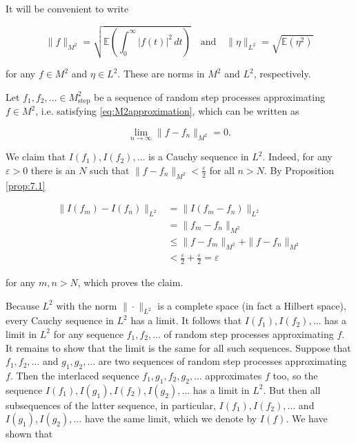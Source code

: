 \begin{Proof}
It will be convenient to write

\begin{equation}
\|f\|_{M^2} = \sqrt{\mathbb{E}\left(\int_0^\infty |f(t)|^2 \, dt\right)} \quad \text{and} \quad \|\eta\|_{L^2} = \sqrt{\mathbb{E}(\eta^2)}
\end{equation}

for any $f \in M^2$ and $\eta \in L^2$. These are norms in $M^2$ and $L^2$, respectively.

Let $f_1, f_2, \ldots \in M_{\mathrm{step}}^2$ be a sequence of random step processes approximating $f \in M^2$, i.e. satisfying \eqref{eq:M2approximation}, which can be written as

\begin{equation}
\lim_{n \to \infty} \|f - f_n\|_{M^2} = 0.
\end{equation}

We claim that $I(f_1), I(f_2), \ldots$ is a Cauchy sequence in $L^2$. Indeed, for any $\varepsilon > 0$ there is an $N$ such that $\|f - f_n\|_{M^2} < \frac{\varepsilon}{2}$ for all $n > N$. By Proposition \ref{prop:7.1}

\begin{align}
\|I(f_m) - I(f_n)\|_{L^2} & = \|I(f_m - f_n)\|_{L^2} \\
& = \|f_m - f_n\|_{M^2} \\
& \leq \|f - f_m\|_{M^2} + \|f - f_n\|_{M^2} \\
& < \frac{\varepsilon}{2} + \frac{\varepsilon}{2} = \varepsilon
\end{align}

for any $m, n > N$, which proves the claim.

Because $L^2$ with the norm $\|\cdot\|_{L^2}$ is a complete space (in fact a Hilbert space), every Cauchy sequence in $L^2$ has a limit. It follows that $I(f_1), I(f_2), \ldots$ has a limit in $L^2$ for any sequence $f_1, f_2, \ldots$ of random step processes approximating $f$. It remains to show that the limit is the same for all such sequences. Suppose that $f_1, f_2, \ldots$ and $g_1, g_2, \ldots$ are two sequences of random step processes approximating $f$. Then the interlaced sequence $f_1, g_1, f_2, g_2, \ldots$ approximates $f$ too, so the sequence $I(f_1), I(g_1), I(f_2), I(g_2), \ldots$ has a limit in $L^2$. But then all subsequences of the latter sequence, in particular, $I(f_1), I(f_2), \ldots$ and $I(g_1), I(g_2), \ldots$ have the same limit, which we denote by $I(f)$. We have shown that


\end{Proof}
